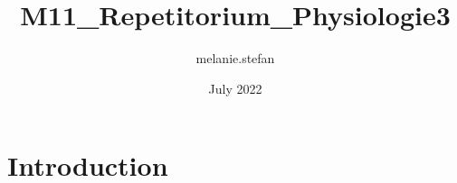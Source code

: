 \documentclass{article}
\title{M11_Repetitorium_Physiologie3}
\author{melanie.stefan }
\date{July 2022}
\begin{document}
\maketitle

\section{Introduction}
\end{document}
